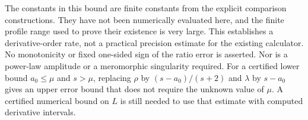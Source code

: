 The constants in this bound are finite constants from the explicit
comparison constructions.  They have not been numerically evaluated
here, and the finite profile range used to prove their existence is
very large.  This establishes a derivative-order rate, not a practical
precision estimate for the existing calculator.  No monotonicity or
fixed one-sided sign of the ratio error is asserted.  Nor is a
power-law amplitude or a meromorphic singularity required.
For a certified lower bound $a_0\le\mu$ and $s>\mu$, replacing
$\rho$ by $(s-a_0)/(s+2)$ and $\lambda$ by $s-a_0$ gives an upper
error bound that does not require the unknown value of $\mu$.
A certified numerical bound on $L$ is still needed to use that
estimate with computed derivative intervals.
